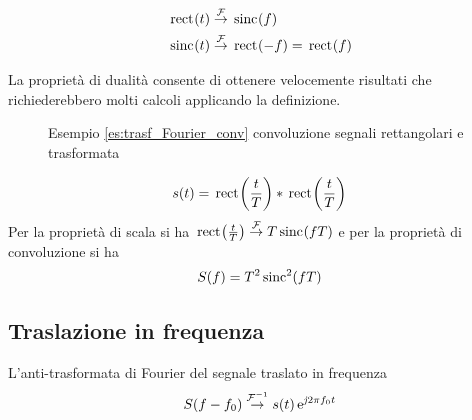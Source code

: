 \begin{esempio}
\begin{equation}
	\begin{split}
		\,{\operatorname{rect}}^{}\!\left({t}\right)&\overset{\operatorname{\mathcal{F}}}{\to}\,{\operatorname{sinc}}^{}\!\left({f}\right)\\
		\,{\operatorname{sinc}}^{}\!\left({t}\right)&\overset{\operatorname{\mathcal{F}}}{\to}\,{\operatorname{rect}}^{}\!\left({-f}\right)=\,{\operatorname{rect}}^{}\!\left({f}\right)
	\end{split}
\end{equation}
\end{esempio}

\begin{nota}
	La proprietà di dualità consente di ottenere velocemente risultati che richiederebbero molti calcoli applicando la definizione.
\end{nota}

\begin{esempio}
\label{es:trasf_Fourier_conv}

\begin{figure}[!ht]
	\centering
	\qquad
	\caption{Esempio \ref{es:trasf_Fourier_conv} convoluzione segnali rettangolari e trasformata}
\end{figure}

\[
	s(t)=\,{\operatorname{rect}}^{}\!\left({\frac{t}{T}}\right)\ast\,{\operatorname{rect}}^{}\!\left({\frac{t}{T}}\right)
\]
Per la proprietà di scala si ha $\,{\operatorname{rect}}^{}\!\left({\frac{t}{T}}\right)\overset{\operatorname{\mathcal{F}}}{\to}T\,{\operatorname{sinc}}^{}\!\left({f T}\right)$ e per la proprietà di convoluzione si ha
\[
	S(f)=T^2\operatorname{sinc}^2(f T)
\]
\end{esempio}

\subsection{Traslazione in frequenza}
L'anti-trasformata di Fourier del segnale traslato in frequenza
\begin{equation}
	S(f-f_0)\overset{\operatorname{\mathcal{F}}^{-1}}{\rightarrow}s(t)\operatorname{e}^{\operatorname{\mathit{j}\!} 2\pi f_0 t}
\end{equation}

